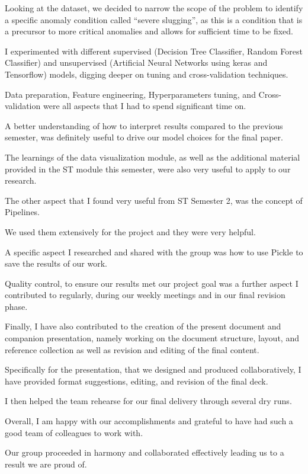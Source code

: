 \documentclass{article}
\begin{document}
Looking at the dataset, we decided to narrow the scope of the problem to identify a specific anomaly condition called “severe slugging”, as this is a condition that is a precursor to more critical anomalies and allows for sufficient time to be fixed.

I experimented with different supervised (Decision Tree Classifier, Random Forest Classifier) and unsupervised (Artificial Neural Networks using keras and Tensorflow) models, digging deeper on tuning and cross-validation techniques.

Data preparation, Feature engineering, Hyperparameters tuning, and Cross-validation were all aspects that I had to spend significant time on.

A better understanding of how to interpret results compared to the previous semester, was definitely useful to drive our model choices for the final paper.

The learnings of the data visualization module, as well as the additional material provided in the ST module this semester, were also very useful to apply to our research.

The other aspect that I found very useful from ST Semester 2, was the concept of Pipelines.

We used them extensively for the project and they were very helpful.

A specific aspect I researched and shared with the group was how to use Pickle to save the results of our work.

Quality control, to ensure our results met our project goal was a further aspect I contributed to regularly, during our weekly meetings and in our final revision phase.

Finally, I have also contributed to the creation of the present document and companion presentation, namely working on the document structure, layout, and reference collection as well as revision and editing of the final content.

Specifically for the presentation, that we designed and produced collaboratively, I have provided format suggestions, editing, and revision of the final deck.

I then helped the team rehearse for our final delivery through several dry runs.

Overall, I am happy with our accomplishments and grateful to have had such a good team of colleagues to work with.

Our group proceeded in harmony and collaborated effectively leading us to a result we are proud of.
\end{document}
